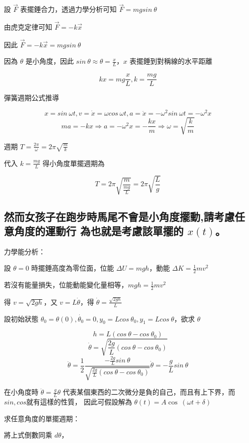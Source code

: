 \documentclass[UTF8,a4paper,12pt]{article}
\begin{document}
設 $\vec{F}$ 表擺錘合力，透過力學分析可知 $\vec{F} = mgsin\ \theta$

由虎克定律可知 $\vec{F} = -k\vec{x}$

因此 $\vec{F} = -k\vec{x} = mgsin\ \theta$

因為 $\theta$ 是小角度，因此 $sin\ \theta ≈ \theta = \frac{x}{L}$，$x$ 表擺錘到對稱線的水平距離

$$kx = mg\frac{x}{L}, k = \frac{mg}{L}$$

彈簧週期公式推導

$$x = sin\ \omega t, v = \dot{x} = \omega cos\ \omega t, a = \ddot{x} = - \omega^2 sin\ \omega t = - \omega^2 x$$
$$ma = -kx \Rightarrow a = -\omega^2 x = -\frac{kx}{m} \Rightarrow \omega = \sqrt{\frac{k}{m}}$$

週期 $T = \frac{2\pi}{\omega} = 2\pi \sqrt{\frac{m}{k}}$

代入 $k = \frac{mg}{L}$
得小角度單擺週期為

$$T = 2\pi \sqrt{\frac{m}{\frac{mg}{L}}} = 2\pi \sqrt{\frac{L}{g}}$$

\subsection{然而女孩子在跑步時馬尾不會是小角度擺動,請考慮任意角度的運動行
為也就是考慮該單擺的 \texorpdfstring{$x(t)$}{x(t)}。}

力學能分析：

設 $\theta = 0$ 時擺錘高度為零位面，位能 $\Delta U = mgh$，動能 $\Delta K = \frac{1}{2}mv^2$

若沒有能量損失，位能動能變化量相等，$mgh = \frac{1}{2}mv^2$

得 $v = \sqrt{2gh}$，又 $v = L \dot{\theta}$，得 $\dot{\theta} = \frac{\sqrt{2gh}}{L}$

設初始狀態 $\theta_0 = \theta(0), \dot{\theta_0} = 0 , y_0 = L cos\ \theta_0, y_1 = L cos\ \theta$，欲求 $\theta$

$$h = L(cos\ \theta - cos\ \theta_0)$$
$$\dot{\theta} = \sqrt{\frac{2g}{L}(cos\ \theta - cos\ \theta_0)} $$
$$\ddot{\theta} = \frac{1}{2} \frac{-\frac{2g}{L}sin\ \theta}{\sqrt{\frac{2g}{L}(cos\ \theta - cos\ \theta_0)}} \dot{\theta} = -\frac{g}{L}sin\ \theta $$

在小角度時 $\ddot{\theta} = \frac{g}{L}\theta $
代表某個東西的二次微分是負的自己，而且有上下界，而$sin, cos$就有這樣的性質，
因此可假設解為 $\theta(t) = A \cos\ (\omega t + \delta)$

求任意角度的單擺週期：

將上式倒數同乘 $d\theta$，
\end{document}
